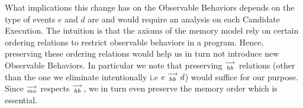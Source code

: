     What implications this change has on the Observable Behaviors depends on the type of events $e$ and $d$ are and would require an analysis on each Candidate Execution. 
    The intuition is that the axioms of the memory model rely on certain ordering relations to restrict observable behaviors in a program.
    Hence, preserving these ordering relations would help us in turn not introduce new Observable Behaviors.
    In particular we note that preserving $\stackrel{\longrightarrow}{_{hb}}$ relations (other than the one we eliminate intentionally i.e $e\stackrel{\longrightarrow}{_{hb}}d$) would suffice for our purpose. 
    Since $\stackrel{\longrightarrow}{_{mo}}$ respects $\stackrel{\longrightarrow}{_{hb}}$, we in turn even preserve the memory order which is essential.  
    

